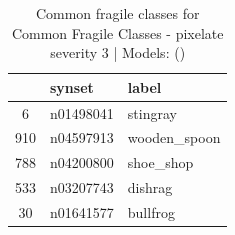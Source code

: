 \begin{table}
\caption{Common fragile classes for Common Fragile Classes - pixelate severity 3 | Models: ()}
\label{tab:Common Fragile Classes - pixelate severity 3_d41d8cd9}
\begin{tabular}{cll}
\toprule
 & synset & label \\
\midrule
6 & n01498041 & stingray \\
910 & n04597913 & wooden_spoon \\
788 & n04200800 & shoe_shop \\
533 & n03207743 & dishrag \\
30 & n01641577 & bullfrog \\
\bottomrule
\end{tabular}
\end{table}
